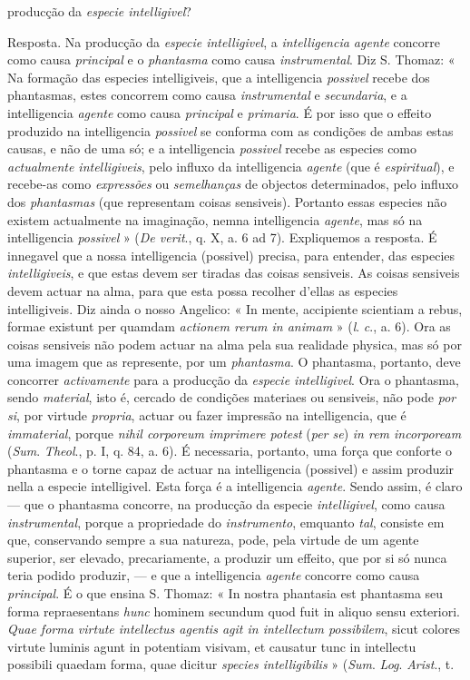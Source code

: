 producção da \emph{especie intelligivel}?\par Resposta. Na producção da \emph{especie intelligivel}, a \emph{intelligencia agente} concorre como causa \emph{principal} e o \emph{phantasma} como causa \emph{instrumental}. Diz S. Thomaz: « Na formação das especies intelligiveis, que a intelligencia \emph{possivel} recebe dos phantasmas, estes concorrem como causa \emph{instrumental} e \emph{secundaria}, e a intelligencia \emph{agente} como causa \emph{principal} e \emph{primaria}. É por isso que o effeito produzido na intelligencia \emph{possivel} se conforma com as condições de ambas estas causas, e não de uma só; e a intelligencia \emph{possivel} recebe as especies como \emph{actualmente intelligiveis}, pelo influxo da intelligencia \emph{agente} (que é \emph{espiritual}), e recebe-as como \emph{expressões} ou \emph{semelhanças} de objectos determinados, pelo influxo dos \emph{phantasmas} (que representam coisas sensiveis). Portanto essas especies não existem actualmente na imaginação, nemna intelligencia \emph{agente}, mas só na intelligencia \emph{possivel} » (\emph{De verit}., q. X, a. 6 ad 7). Expliquemos a resposta. É innegavel que a nossa intelligencia (possivel) precisa, para entender, das especies \emph{intelligiveis}, e que estas devem ser tiradas das coisas sensiveis. As coisas sensiveis devem actuar na alma, para que esta possa recolher d'ellas as especies intelligiveis. Diz ainda o nosso Angelico: « In mente, accipiente scientiam a rebus, formae existunt per quamdam \emph{actionem rerum in animam} » (\emph{l}. \emph{c}., a. 6). Ora as coisas sensiveis não podem actuar na alma pela sua realidade physica, mas só por uma imagem que as represente, por um \emph{phantasma}. O phantasma, portanto, deve concorrer \emph{activamente} para a producção da \emph{especie intelligivel}. Ora o phantasma, sendo \emph{material}, isto é, cercado de condições materiaes ou sensiveis, não pode \emph{por si}, por virtude \emph{propria}, actuar ou fazer impressão na intelligencia, que é \emph{immaterial}, porque \emph{nihil corporeum imprimere potest} (\emph{per se}) \emph{in rem incorpoream} (\emph{Sum}. \emph{Theol}., p. I, q. 84, a. 6). É necessaria, portanto, uma força que conforte o phantasma e o torne capaz de actuar na intelligencia (possivel) e assim produzir nella a especie intelligivel. Esta força é a intelligencia \emph{agente}. Sendo assim, é claro --- que o phantasma concorre, na producção da especie \emph{intelligivel}, como causa \emph{instrumental}, porque a propriedade do \emph{instrumento}, emquanto \emph{tal}, consiste em que, conservando sempre a sua natureza, pode, pela virtude de um agente superior, ser elevado, precariamente, a produzir um effeito, que por si só nunca teria podido produzir, --- e que a intelligencia \emph{agente} concorre como causa \emph{principal}. É o que ensina S. Thomaz: « In nostra phantasia est phantasma seu forma repraesentans \emph{hunc} hominem secundum quod fuit in aliquo sensu exteriori. \emph{Quae forma virtute intellectus agentis agit in intellectum possibilem}, sicut colores virtute luminis agunt in potentiam visivam, et causatur tunc in intellectu possibili quaedam forma, quae dicitur \emph{species intelligibilis} » (\emph{Sum}. \emph{Log}. \emph{Arist}., t. 
